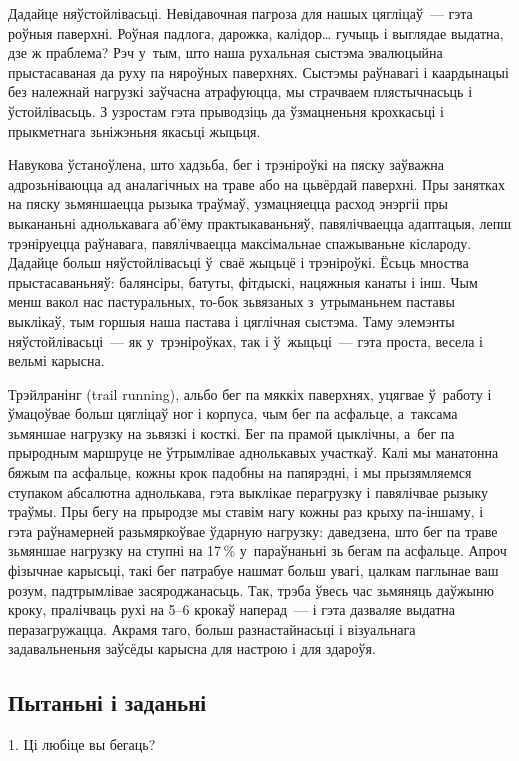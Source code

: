 Дадайце няўстойлівасьці. Невідавочная пагроза для нашых цягліцаў~--- гэта роўныя паверхні. Роўная падлога, дарожка, калідор… гучыць і выглядае выдатна, дзе ж праблема? Рэч у~тым, што наша рухальная сыстэма эвалюцыйна прыстасаваная да руху па няроўных паверхнях. Сыстэмы раўнавагі і каардынацыі без належнай нагрузкі заўчасна атрафуюцца, мы страчваем плястычнасьць і ўстойлівасьць. З узростам гэта прыводзіць да ўзмацненьня крохкасьці і прыкметнага зьніжэньня якасьці жыцьця.

Навукова ўстаноўлена, што хадзьба, бег і трэніроўкі на пяску заўважна адрозьніваюцца ад аналагічных на траве або на цьвёрдай паверхні. Пры занятках на пяску зьмяншаецца рызыка траўмаў, узмацняецца расход энэргіі пры выкананьні аднолькавага аб'ёму практыкаваньняў, павялічваецца адаптацыя, лепш трэніруецца раўнавага, павялічваецца максімальнае спажываньне кіслароду. Дадайце больш няўстойлівасьці ў~сваё жыцьцё і трэніроўкі. Ёсьць мноства прыстасаваньняў: балянсіры, батуты, фітдыскі, нацяжныя канаты і інш. Чым менш вакол нас пастуральных, то-бок зьвязаных з~утрыманьнем паставы выклікаў, тым горшыя наша пастава і цяглічная сыстэма. Таму элемэнты няўстойлівасьці~--- як у~трэніроўках, так і ў~жыцьці~--- гэта проста, весела і вельмі карысна.

Трэйлранінг (trail running), альбо бег па мяккіх паверхнях, уцягвае ў~работу і ўмацоўвае больш цягліцаў ног і корпуса, чым бег па асфальце, а~таксама зьмяншае нагрузку на зьвязкі і косткі. Бег па прамой цыклічны, а~бег па прыродным маршруце не ўтрымлівае аднолькавых участкаў. Калі мы манатонна бяжым па асфальце, кожны крок падобны на папярэдні, і мы прызямляемся ступаком абсалютна аднолькава, гэта выклікае перагрузку і павялічвае рызыку траўмы. Пры бегу на прыродзе мы ставім нагу кожны раз крыху па-іншаму, і гэта раўнамерней разьмяркоўвае ўдарную нагрузку: даведзена, што бег па траве зьмяншае нагрузку на ступні на 17\,\% у~параўнаньні зь бегам па асфальце. Апроч фізычнае карысьці, такі бег патрабуе нашмат больш увагі, цалкам паглынае ваш розум, падтрымлівае засяроджанасьць. Так, трэба ўвесь час зьмяняць даўжыню кроку, пралічваць рухі на 5--6 крокаў наперад~--- і гэта дазваляе выдатна перазагружацца. Акрамя таго, больш разнастайнасьці і візуальнага задавальненьня заўсёды карысна для настрою і для здароўя.

\subsection*{Пытаньні і заданьні}

1. Ці любіце вы бегаць?

